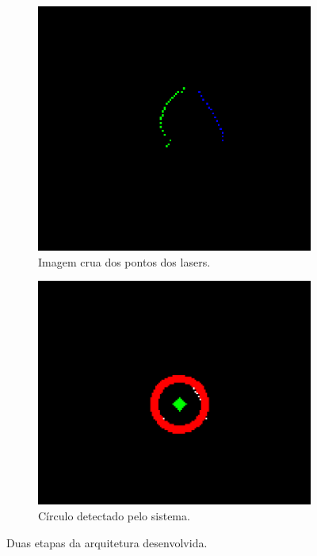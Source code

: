 \documentclass[acronym, symbols, table, deposito]{fei}
\begin{document}
				\begin{figure}[!h]
					\centering
					\begin{subfigure}[t]{0.38\textwidth}
						\centering
						\includegraphics[width=\textwidth]{raw_lidars_image.png}
						\caption{Imagem crua dos pontos dos lasers.} \label{fig:raw_image}
					\end{subfigure}%
					\hspace{1em}
					\begin{subfigure}[t]{0.415\textwidth}
						\centering
						\includegraphics[width=\textwidth]{robot_detected_image.png}
						\caption{Círculo detectado pelo sistema.} \label{fig:robot_detected}
					\end{subfigure}
					
					\caption{Duas etapas da arquitetura desenvolvida.}
					\label{fig:robot_detection}
				\end{figure}
			
\end{document}
